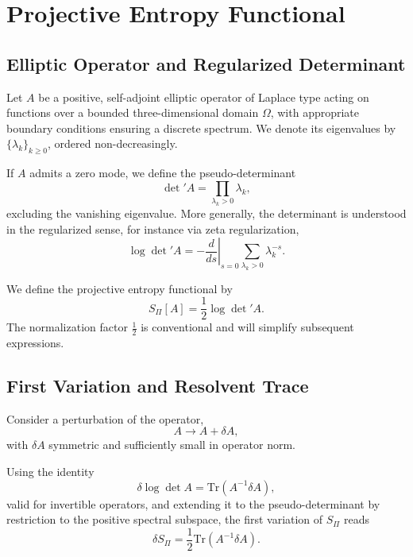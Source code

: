 \section{Projective Entropy Functional}

  \subsection{Elliptic Operator and Regularized Determinant}

    Let $A$ be a positive, self-adjoint elliptic operator of Laplace type
    acting on functions over a bounded three-dimensional domain $\Omega$,
    with appropriate boundary conditions ensuring a discrete spectrum.
    We denote its eigenvalues by $\{\lambda_k\}_{k \ge 0}$,
    ordered non-decreasingly.

    If $A$ admits a zero mode, we define the pseudo-determinant
    \begin{equation}
      \det{}' A = \prod_{\lambda_k > 0} \lambda_k,
    \end{equation}
    excluding the vanishing eigenvalue.
    More generally, the determinant is understood in the regularized sense,
    for instance via zeta regularization,
    \begin{equation}
      \log \det{}' A = - \left.\frac{d}{ds}\right|_{s=0}
      \sum_{\lambda_k > 0} \lambda_k^{-s}.
    \end{equation}

    We define the projective entropy functional by
    \begin{equation}
      S_\Pi[A] = \frac12 \log \det{}' A.
    \end{equation}
    The normalization factor $\tfrac12$ is conventional and will simplify subsequent expressions.

  \subsection{First Variation and Resolvent Trace}

    Consider a perturbation of the operator,
    \begin{equation}
      A \longrightarrow A + \delta A,
    \end{equation}
    with $\delta A$ symmetric and sufficiently small in operator norm.

    Using the identity
    \begin{equation}
      \delta \log \det A = \mathrm{Tr}(A^{-1} \delta A),
    \end{equation}
    valid for invertible operators,
    and extending it to the pseudo-determinant by restriction to the positive spectral subspace,
    the first variation of $S_\Pi$ reads
    \begin{equation}
      \delta S_\Pi
      = \frac12 \mathrm{Tr}(A^{-1} \delta A).
    \end{equation}

